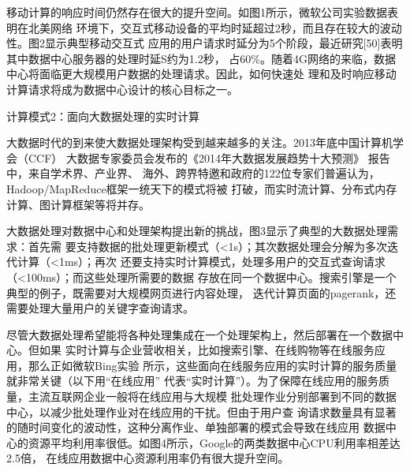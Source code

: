 移动计算的响应时间仍然存在很大的提升空间。如图1所示，微软公司实验数据表明在北美网络
环境下，交互式移动设备的平均时延超过2秒，而且存在较大的波动性。图2显示典型移动交互式
应用的用户请求时延分为5个阶段，最近研究[50]表明其中数据中心服务器的处理时延S约为1.2秒，
占60\%。随着4G网络的来临，数据中心将面临更大规模用户数据的处理请求。因此，如何快速处
理和及时响应移动计算请求将成为数据中心设计的核心目标之一。


计算模式2：面向大数据处理的实时计算

大数据时代的到来使大数据处理架构受到越来越多的关注。2013年底中国计算机学会（CCF）
大数据专家委员会发布的《2014年大数据发展趋势十大预测》 报告中，来自学术界、产业界、
海外、跨界特邀和政府的122位专家们普遍认为，Hadoop/MapReduce框架一统天下的模式将被
打破，而实时流计算、分布式内存计算、图计算框架等将并存。

大数据处理对数据中心和处理架构提出新的挑战，图3显示了典型的大数据处理需求：首先需
要支持数据的批处理更新模式（<1s）；其次数据处理会分解为多次迭代计算（<1ms）；再次
还要支持实时计算模式，处理多用户的交互式查询请求（<100ms）；而这些处理所需要的数据
存放在同一个数据中心。搜索引擎是一个典型的例子，既需要对大规模网页进行内容处理，
迭代计算页面的pagerank，还需要处理大量用户的关键字查询请求。

尽管大数据处理希望能将各种处理集成在一个处理架构上，然后部署在一个数据中心。但如果
实时计算与企业营收相关，比如搜索引擎、在线购物等在线服务应用，那么正如微软Bing实验
所示，这些面向在线服务应用的实时计算的服务质量就非常关键（以下用“在线应用”
代表“实时计算”）。为了保障在线应用的服务质量，主流互联网企业一般将在线应用与大规模
批处理作业分别部署到不同的数据中心，以减少批处理作业对在线应用的干扰。但由于用户查
询请求数量具有显著的随时间变化的波动性，这种分离作业、单独部署的模式会导致在线应用
数据中心的资源平均利用率很低。如图4所示，Google的两类数据中心CPU利用率相差达2.5倍，
在线应用数据中心资源利用率仍有很大提升空间。


